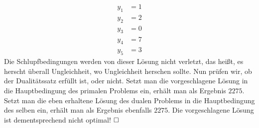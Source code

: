 \documentclass [a4paper,11pt]{article}
\begin{document}
\begin{enumerate}
\begin{enumerate}
                    \begin{align*}
                        y_1 &= 1\\
                        y_2 &= 2\\
                        y_3 &= 0\\
                        y_4 &= 7\\
                        y_5 &= 3
                    \end{align*}
                    Die Schlupfbedingungen werden von dieser Lösung nicht verletzt, das heißt, es herscht überall Ungleichheit, wo Ungleichheit herschen sollte.
                    Nun prüfen wir, ob der Dualitätssatz erfüllt ist, oder nicht. Setzt man die vorgeschlagene Lösung in die Hauptbedingung des primalen Problems
                    ein, erhält man als Ergebnis $2275$. Setzt man die eben erhaltene Lösung des dualen Problems in die Hauptbedingung des selben ein,
                    erhält man als Ergebnis ebenfalls $2275$. Die vorgeschlagene Lösung ist dementsprechend nicht optimal! $\qed$
            \end{enumerate}

    \end{enumerate}
\end{document}

